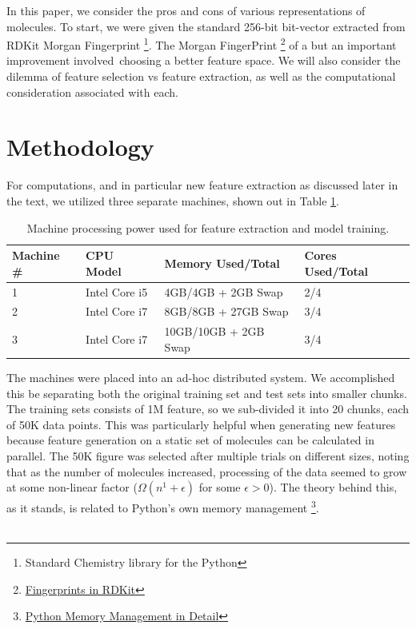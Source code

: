 \documentclass[letterpaper]{article}
\begin{document}
\noindent In this paper, we consider the pros and cons of various representations of molecules. To start, we were given the standard 256-bit bit-vector extracted from RDKit Morgan Fingerprint \footnote{Standard Chemistry library for the Python}. The Morgan FingerPrint \footnote{\href{http://rdkit.org/UGM/2012/Landrum_RDKit_UGM.Fingerprints.Final.pptx.pdf}{Fingerprints in RDKit}} of a  but an important improvement involved choosing a better feature space. We will also consider the dilemma of feature selection vs feature extraction, as well as the computational consideration associated with each.

\section{Methodology}
 For computations, and in particular new feature extraction as discussed later in the text, we utilized three separate machines, shown out in Table \ref{tab:computers}.
 
\begin{table}
\begin{center}
    \begin{tabular}{ | p{2cm} | p{1cm} | p{2cm} | p{2cm} |}
    \hline
    Machine \# & CPU Model & Memory Used/Total & Cores Used/Total \\ \hline
    1 & Intel Core i5 & 4GB/4GB + 2GB Swap & 2/4 \\ \hline
    2 & Intel Core i7 & 8GB/8GB + 27GB Swap & 3/4 \\ \hline
    3 & Intel Core i7 & 10GB/10GB + 2GB Swap & 3/4 \\
    \hline
    \end{tabular}
    \caption{Machine processing power used for feature extraction and model training.}
    \label{tab:computers}
\end{center}
\end{table}
 
\noindent The machines were placed into an ad-hoc distributed system. We accomplished this be separating both the original training set and test sets into smaller chunks. The training sets consists of 1M feature, so we sub-divided it into 20 chunks, each of 50K data points. This was particularly helpful when generating new features because feature generation on a static set of molecules can be calculated in parallel. The 50K figure was selected after multiple trials on different sizes, noting that as the number of molecules increased, processing of the data seemed to grow at some non-linear factor ($\Omega(n^1+\epsilon)$ for some $\epsilon > 0$). The theory behind this, as it stands, is related to Python's own memory management \footnote{\href{https://docs.python.org/2/c-api/memory.html}{Python Memory Management in Detail}}.\\ 
\\
\end{document}
